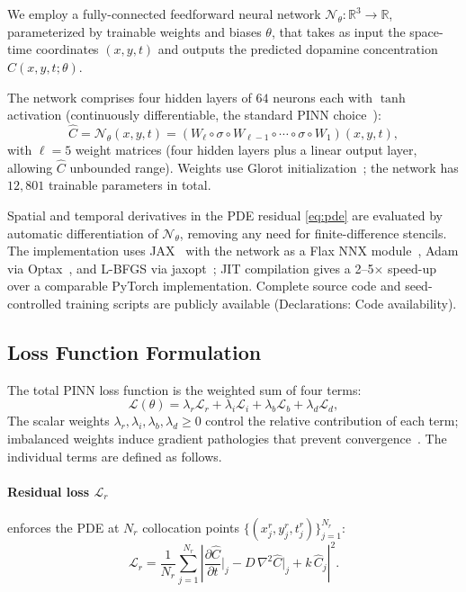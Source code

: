 \documentclass[12pt]{article}
\begin{document}
We employ a fully-connected feedforward neural network
$\mathcal{N}_\theta : \mathbb{R}^3 \to \mathbb{R}$,
parameterized by trainable weights and biases $\theta$, that
takes as input the space-time coordinates $(x, y, t)$ and
outputs the predicted dopamine concentration
$\hat{C}(x, y, t; \theta)$.

The network comprises four hidden layers of $64$ neurons each
with $\tanh$ activation (continuously differentiable, the
standard PINN choice~\cite{Raissi2019}):
\begin{equation}
  \hat{C} = \mathcal{N}_\theta(x, y, t) =
  (W_\ell \circ \sigma \circ W_{\ell-1} \circ \cdots
  \circ \sigma \circ W_1)(x, y, t),
  \label{eq:network}
\end{equation}
with $\ell = 5$ weight matrices (four hidden layers plus a
linear output layer, allowing $\hat{C}$ unbounded range). Weights
use Glorot initialization~\cite{Glorot2010}; the network has
$12{,}801$ trainable parameters in total.

Spatial and temporal derivatives in the PDE residual
\eqref{eq:pde} are evaluated by automatic differentiation of
$\mathcal{N}_\theta$, removing any need for finite-difference
stencils. The implementation uses JAX~\cite{JAX2018} with the
network as a Flax NNX module~\cite{Heek2020}, Adam via
Optax~\cite{Optax2020}, and L-BFGS via
jaxopt~\cite{Blondel2022}; JIT compilation gives a
2--5$\times$ speed-up over a comparable PyTorch implementation.
Complete source code and seed-controlled training scripts are
publicly available (Declarations: Code availability).

\subsection{Loss Function Formulation}
\label{sec:loss}

The total PINN loss function is the weighted sum of four terms:
\begin{equation}
  \mathcal{L}(\theta) = \lambda_r \mathcal{L}_r
  + \lambda_i \mathcal{L}_i
  + \lambda_b \mathcal{L}_b
  + \lambda_d \mathcal{L}_d,
  \label{eq:loss_total}
\end{equation}
The scalar weights $\lambda_r, \lambda_i, \lambda_b, \lambda_d \ge 0$
control the relative contribution of each term; imbalanced
weights induce gradient pathologies that prevent
convergence~\cite{Wang2021}. The individual terms are defined
as follows.

\paragraph{Residual loss $\mathcal{L}_r$} enforces the PDE
at $N_r$ collocation points
$\{(x_j^r, y_j^r, t_j^r)\}_{j=1}^{N_r}$:
\begin{equation}
  \mathcal{L}_r = \frac{1}{N_r} \sum_{j=1}^{N_r}
  \left| \frac{\partial \hat{C}}{\partial t}\bigg|_j
  - D\,\nabla^2 \hat{C}\bigg|_j
  + k\,\hat{C}_j \right|^2.
  \label{eq:loss_r}
\end{equation}
\end{document}

